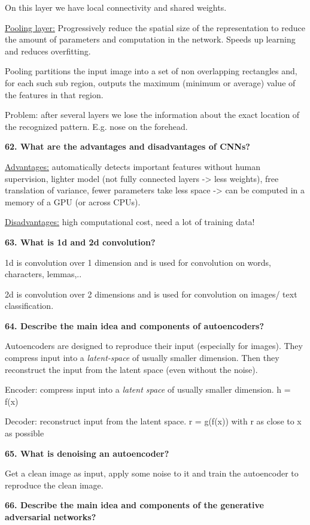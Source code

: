 On this layer we have local connectivity and shared weights.

\underline{Pooling layer:} Progressively reduce the spatial size of the
representation to reduce the amount of parameters and computation in the
network. Speeds up learning and reduces overfitting.

Pooling partitions the input image into a set of non overlapping
rectangles and, for each such sub region, outputs the maximum (minimum
or average) value of the features in that region.

Problem: after several layers we lose the information about the exact
location of the recognized pattern. E.g. nose on the forehead.

\textbf{62. What are the advantages and disadvantages of CNNs?}

\underline{Advantages:} automatically detects important features without
human supervision, lighter model (not fully connected layers
-\textgreater{} less weights), free translation of variance, fewer
parameters take less space -\textgreater{} can be computed in a memory
of a GPU (or across CPUs).

\underline{Disadvantages:} high computational cost, need a lot of
training data!

\textbf{63. What is 1d and 2d convolution?}

1d is convolution over 1 dimension and is used for convolution on words,
characters, lemmas,..

2d is convolution over 2 dimensions and is used for convolution on
images/ text classification.

\textbf{64. Describe the main idea and components of autoencoders?}

Autoencoders are designed to reproduce their input (especially for
images). They compress input into a \emph{latent-space} of usually
smaller dimension. Then they reconstruct the input from the latent space
(even without the noise).

Encoder: compress input into a \emph{latent space} of usually smaller
dimension. h = f(x)

Decoder: reconstruct input from the latent space. r = g(f(x)) with r as
close to x as possible

\textbf{65. What is denoising an autoencoder?}

Get a clean image as input, apply some noise to it and train the
autoencoder to reproduce the clean image.

\textbf{66. Describe the main idea and components of the generative
adversarial networks?}

